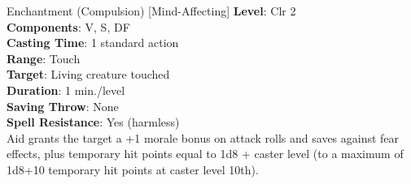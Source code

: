 {Enchantment (Compulsion) [Mind-Affecting]}
{
	\textbf{Level}: Clr 2\\
	\textbf{Components}: V, S, DF\\
	\textbf{Casting Time}: 1 standard action\\
	\textbf{Range}: Touch\\
	\textbf{Target}: Living creature touched\\
	\textbf{Duration}: 1 min./level\\
	\textbf{Saving Throw}: None\\
	\textbf{Spell Resistance}: Yes (harmless)\\
}
{
	Aid grants the target a +1 morale bonus on attack rolls and saves against fear effects, plus temporary hit points equal to 1d8 + caster level (to a maximum of 1d8+10 temporary hit points at caster level 10th).
}